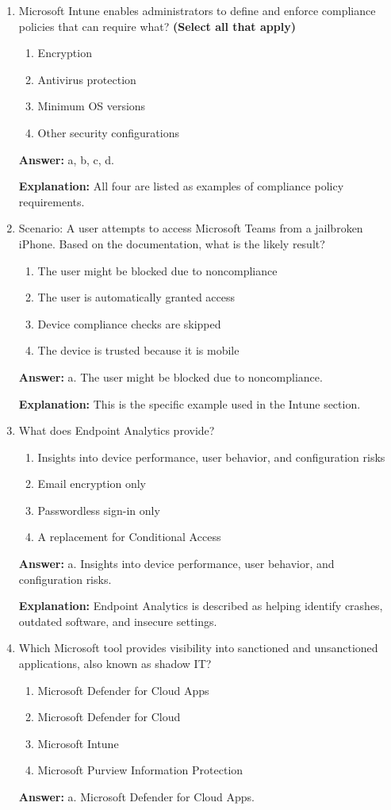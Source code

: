 \documentclass[10pt]{article}
\begin{document}
\begin{enumerate}[leftmargin=*]
\item Microsoft Intune enables administrators to define and enforce compliance policies that can require what? \textbf{(Select all that apply)}
\begin{enumerate}[label=\alph*., leftmargin=1.5em]
\item Encryption
\item Antivirus protection
\item Minimum OS versions
\item Other security configurations
\end{enumerate}
\textbf{Answer:} a, b, c, d.

\textbf{Explanation:} All four are listed as examples of compliance policy requirements.

\item Scenario: A user attempts to access Microsoft Teams from a jailbroken iPhone. Based on the documentation, what is the likely result?
\begin{enumerate}[label=\alph*., leftmargin=1.5em]
\item The user might be blocked due to noncompliance
\item The user is automatically granted access
\item Device compliance checks are skipped
\item The device is trusted because it is mobile
\end{enumerate}
\textbf{Answer:} a. The user might be blocked due to noncompliance.

\textbf{Explanation:} This is the specific example used in the Intune section.

\item What does Endpoint Analytics provide?
\begin{enumerate}[label=\alph*., leftmargin=1.5em]
\item Insights into device performance, user behavior, and configuration risks
\item Email encryption only
\item Passwordless sign-in only
\item A replacement for Conditional Access
\end{enumerate}
\textbf{Answer:} a. Insights into device performance, user behavior, and configuration risks.

\textbf{Explanation:} Endpoint Analytics is described as helping identify crashes, outdated software, and insecure settings.

\item Which Microsoft tool provides visibility into sanctioned and unsanctioned applications, also known as shadow IT?
\begin{enumerate}[label=\alph*., leftmargin=1.5em]
\item Microsoft Defender for Cloud Apps
\item Microsoft Defender for Cloud
\item Microsoft Intune
\item Microsoft Purview Information Protection
\end{enumerate}
\textbf{Answer:} a. Microsoft Defender for Cloud Apps.


\end{enumerate}
\end{document}
